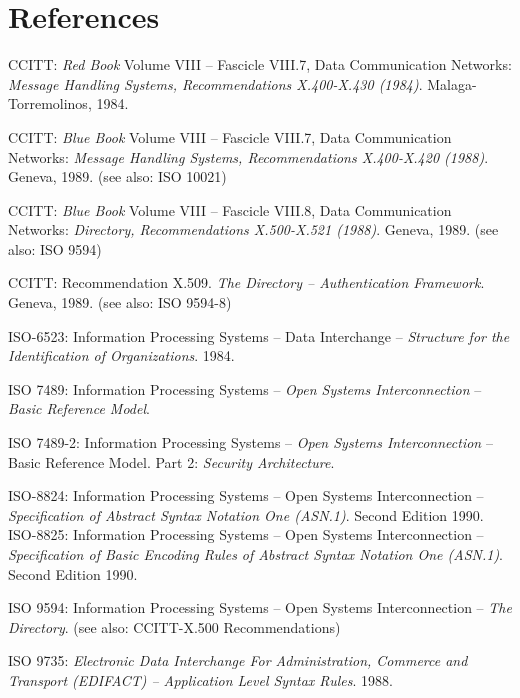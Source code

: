 \section{References}
\thispagestyle{myheadings}
\label{references}

\begin{thebibliography}{99}

CCITT: {\em Red Book} Volume VIII -- Fascicle VIII.7,
Data Communication Networks:
{\em Message Handling Systems,
Recommendations X.400-X.430 (1984)}.
Malaga-Torremolinos, 1984.

CCITT: {\em Blue Book} Volume VIII -- Fascicle VIII.7,
Data Communication Networks:
{\em Message Handling Systems,
Recommendations X.400-X.420 (1988)}.
Geneva, 1989.
(see also: ISO 10021)

CCITT: {\em Blue Book} Volume VIII -- Fascicle VIII.8,
Data Communication Networks:
{\em Directory, Recommendations X.500-X.521 (1988)}.
Geneva, 1989.
(see also: ISO 9594)

CCITT: Recommendation X.509.
{\em The Directory -- Authentication Framework}.
Geneva, 1989.
(see also: ISO 9594-8)

ISO-6523:
Information Processing Systems --
Data Interchange --
{\em Structure for the Identification of Organizations}.
1984.

ISO 7489:
Information Processing Systems --
{\em Open Systems Interconnection} --
{\em Basic Reference Model}.

ISO 7489-2:
Information Processing Systems --
{\em Open Systems Interconnection} --
Basic Reference Model.
Part 2: {\em Security Architecture}.

ISO-8824:
Information Processing Systems --
Open Systems Interconnection --
{\em Specification of Abstract Syntax Notation One (ASN.1)}.
Second Edition 1990.\\
ISO-8825:
Information Processing Systems --
Open Systems Interconnection --
{\em Specification of Basic Encoding Rules of
Abstract Syntax Notation One (ASN.1)}.
Second Edition 1990.

ISO 9594:
Information Processing Systems --
Open Systems Interconnection --
{\em The Directory}.
(see also: CCITT-X.500 Recommendations)

ISO 9735:
{\em Electronic Data Interchange For Administration, Commerce
and Transport (EDIFACT) -- Application Level Syntax Rules}.
1988.


\end{thebibliography}
